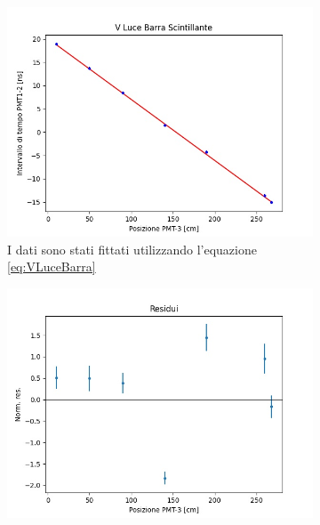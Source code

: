 \documentclass[a4paper]{article}
\begin{document}
\begin{figure}[H]
     \centering
     \begin{subfigure}[b]{0.47\textwidth}
         \centering
         \includegraphics[width=\textwidth]{./immagini/TimeOfFlight/VLightBarra.jpg}
         \caption{I dati sono stati fittati utilizzando l'equazione \ref{eq:VLuceBarra}}
         \label{fig:FitVLightBarra}
     \end{subfigure}
     \hfill
     \begin{subfigure}[b]{0.47\textwidth}
         \centering
         \includegraphics[width=\textwidth]{./immagini/TimeOfFlight/ResVLightBarra.jpg}
         \caption{}
         \label{fig:ResVLIghtBarra}
     \end{subfigure}
     \caption{}        
     \label{fig:FitLinVLightBarra}
\end{figure}
\end{document}
